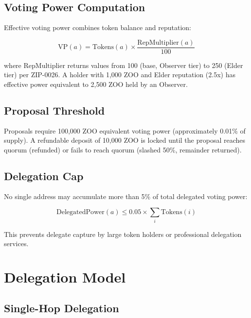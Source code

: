 \documentclass[11pt,letterpaper]{article}
\begin{document}
\subsection{Voting Power Computation}

Effective voting power combines token balance and reputation:

\begin{equation}
    \text{VP}(a) = \text{Tokens}(a) \times \frac{\text{RepMultiplier}(a)}{100}
\end{equation}

where $\text{RepMultiplier}$ returns values from 100 (base, Observer tier) to 250 (Elder tier) per ZIP-0026. A holder with 1{,}000 ZOO and Elder reputation (2.5x) has effective power equivalent to 2{,}500 ZOO held by an Observer.

\subsection{Proposal Threshold}

Proposals require 100{,}000 ZOO equivalent voting power (approximately 0.01\% of supply). A refundable deposit of 10{,}000 ZOO is locked until the proposal reaches quorum (refunded) or fails to reach quorum (slashed 50\%, remainder returned).

\subsection{Delegation Cap}

No single address may accumulate more than 5\% of total delegated voting power:

\begin{equation}
    \text{DelegatedPower}(a) \leq 0.05 \times \sum_{i} \text{Tokens}(i)
\end{equation}

This prevents delegate capture by large token holders or professional delegation services.

\section{Delegation Model}
\label{sec:delegation}

\subsection{Single-Hop Delegation}
\end{document}
